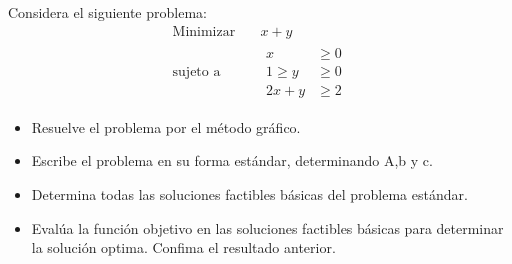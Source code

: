 \documentclass{article}
\begin{document}
Considera el siguiente  problema:
\begin{equation*}
  \begin{aligned}
    \text{Minimizar}\quad  & x+y \\
    \text{sujeto a}\quad  &
  \begin{aligned}
    x & \geq 0\\ 
 1 \geq  y & \geq 0\\
2x + y & \geq 2
  \end{aligned}
  \end{aligned}
\end{equation*}

\begin{itemize}
\item Resuelve el problema por el método gráfico.
\item  Escribe el problema en su forma estándar, determinando A,b y c.
\item Determina todas las soluciones factibles básicas del problema estándar.
  \item Evalúa la función objetivo en las soluciones factibles básicas para determinar la solución optima. Confima el resultado anterior.
  \end{itemize}
\end{document}
